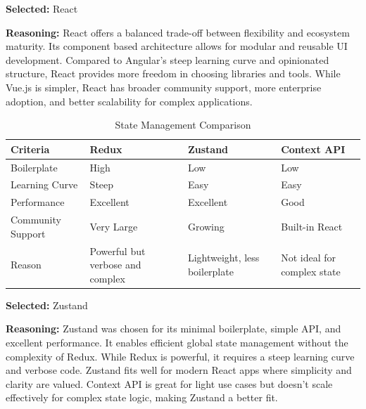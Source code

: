 \textbf{Selected:} React \par
\textbf{Reasoning:} React offers a balanced trade-off between flexibility and ecosystem maturity. Its component based architecture allows for modular and reusable UI development. Compared to Angular’s steep learning curve and opinionated structure, React provides more freedom in choosing libraries and tools. While Vue.js is simpler, React has broader community support, more enterprise adoption, and better scalability for complex applications.

\vspace{2em}

\begin{table}[H]
\centering
\caption{State Management Comparison}
\begin{tabular}{|l|p{4cm}|p{4cm}|p{4cm}|}
\hline
\textbf{Criteria}       & \textbf{Redux}              & \textbf{Zustand}              & \textbf{Context API}          \\
\hline
Boilerplate             & High                        & Low                          & Low                          \\
Learning Curve          & Steep                       & Easy                         & Easy                         \\
Performance             & Excellent                   & Excellent                    & Good                         \\
Community Support       & Very Large                  & Growing                      & Built-in React               \\
Reason                  & Powerful but verbose and complex & Lightweight, less boilerplate & Not ideal for complex state \\
\hline
\end{tabular}
\label{tab:state-management-comparison}
\end{table}

\textbf{Selected:} Zustand \par
\textbf{Reasoning:} Zustand was chosen for its minimal boilerplate, simple API, and excellent performance. It enables efficient global state management without the complexity of Redux. While Redux is powerful, it requires a steep learning curve and verbose code. Zustand fits well for modern React apps where simplicity and clarity are valued. Context API is great for light use cases but doesn’t scale effectively for complex state logic, making Zustand a better fit.

\vspace{2em}

